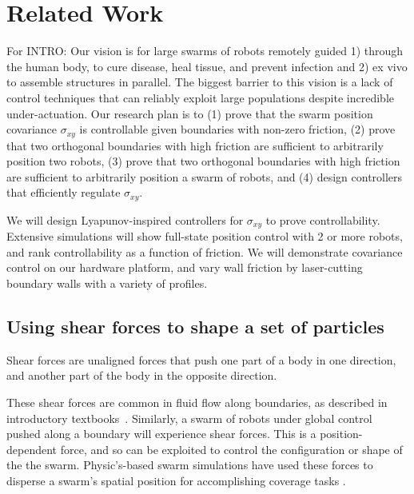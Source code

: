






\section{Related Work}\label{sec:RelatedWork}

For INTRO: Our vision is for large swarms of robots remotely guided 1) through the human body, to cure disease, heal tissue, and prevent infection and 2) ex vivo to assemble structures in parallel. The biggest barrier to this vision is a lack of control techniques that can reliably exploit large populations despite incredible under-actuation.  Our research plan is to (1) prove that the swarm position covariance $\sigma_{xy}$ is controllable given boundaries with non-zero friction, (2) prove that two orthogonal boundaries with high friction are sufficient to arbitrarily position two robots, (3) prove that two orthogonal boundaries with high friction are sufficient to arbitrarily position a swarm of robots, and (4) design controllers that efficiently regulate $\sigma_{xy}$.

We will design Lyapunov-inspired controllers for $\sigma_{xy}$ to prove controllability.  Extensive simulations will show full-state position control with 2 or more robots, and rank controllability as a function of friction.  We will demonstrate covariance control on our hardware platform, and vary wall friction by laser-cutting boundary walls with a variety of profiles.



\subsection{Using shear forces to shape a set of particles}
Shear forces are unaligned forces that push one part of a body in one direction, and another part of the body in the opposite direction. 

These shear forces are common in fluid flow along boundaries, as described in introductory textbooks~\cite{Munson2013}.
Similarly, a swarm of robots under global control pushed along a boundary will experience shear forces.  This is a position-dependent force, and so can be exploited to control the configuration or shape of the the swarm.  Physic's-based swarm simulations have used these forces to disperse a swarm's spatial position for accomplishing coverage tasks \cite{spears2006physics}.




